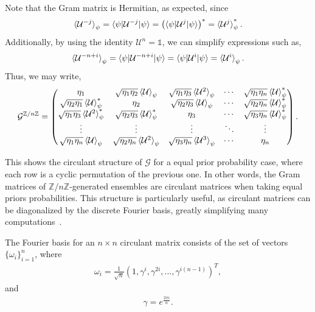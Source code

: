 \documentclass[12pt,letterpaper]{article}
\begin{document}
Note that the Gram matrix is Hermitian, as expected, since
\begin{align*}
    \braket{\mathcal{U}^{-j}}_{\psi} = \braket{\psi | \mathcal{U}^{-j} | \psi} = \left(\braket{\psi | \mathcal{U}^j | \psi}\right)^* = \braket{\mathcal{U}^j}_{\psi}^*.
\end{align*}
Additionally, by using the identity $\mathcal{U}^n = \mathds{1}$, we can simplify expressions such as,
\begin{align*}
	\braket{\mathcal{U}^{-n+i}}_\psi = \braket{\psi | \mathcal{U}^{-n+i} | \psi} = \braket{\psi | \mathcal{U}^i | \psi} = \braket{\mathcal{U}^i}_\psi.
\end{align*}
Thus, we may write,
\begin{align*}
	\mathcal{G}^{\mathbb{Z}/n\mathbb{Z}} = \begin{pmatrix}
 \eta_1 & \sqrt{\eta_1 \eta_2}\braket{\mathcal{U}}_{\psi} & \sqrt{\eta_1 \eta_3}\braket{\mathcal{U}^2}_{\psi} & \cdots & \sqrt{\eta_1 \eta_n}\braket{\mathcal{U}}^*_{\psi} \\
 \sqrt{\eta_2 \eta_1}\braket{\mathcal{U}}^*_{\psi} & \eta_2 & \sqrt{\eta_2 \eta_3}\braket{\mathcal{U}}_{\psi} & \cdots & \sqrt{\eta_2 \eta_n}\braket{\mathcal{U}}^*_{\psi} \\
 \sqrt{\eta_1 \eta_3}\braket{\mathcal{U}^2}^*_{\psi} & \sqrt{\eta_2 \eta_3}\braket{\mathcal{U}}^*_{\psi} & \eta_3 & \cdots & \sqrt{\eta_3 \eta_n}\braket{\mathcal{U}}^*_{\psi} \\
 \vdots & \vdots & \vdots & \ddots & \vdots \\
 \sqrt{\eta_1 \eta_n}\braket{\mathcal{U}}_{\psi} & \sqrt{\eta_2 \eta_n}\braket{\mathcal{U}^{2}}_{\psi} & \sqrt{\eta_3 \eta_n}\braket{\mathcal{U}^{3}}_{\psi} & \cdots & \eta_n
\end{pmatrix}.
\end{align*}

This shows the circulant structure of $\mathcal{G}$ for a equal prior probability case, where each row is a cyclic permutation of the previous one. In other words, the Gram matrices of $\mathbb{Z}/n\mathbb{Z}$-generated ensembles are circulant matrices when taking equal priors probabilities. This structure is particularly useful, as circulant matrices can be diagonalized by the discrete Fourier basis, greatly simplifying many computations~\cite{circulantMatrices}.

The Fourier basis for an $n \times n$ circulant matrix consists of the set of vectors $\{\omega_i\}_{i=1}^n$, where
\begin{align*}
	\omega_i = \frac{1}{\sqrt{n}} (1, \gamma^i, \gamma^{2i}, \ldots, \gamma^{i(n-1)})^T,
\end{align*}
and
\begin{align*}
	\gamma = e^{\frac{2\pi i}{n}}.
\end{align*}
\end{document}
